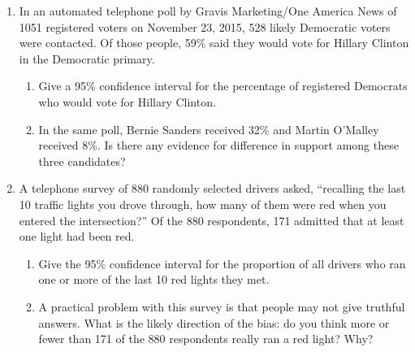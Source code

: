 \begin{enumerate}
\item In an automated telephone poll by Gravis Marketing/One America News of 1051 registered voters on November 23, 2015, 528 likely Democratic voters were contacted.  Of those people, 59\% said they would vote for Hillary Clinton in the Democratic primary.
\begin{enumerate}
	\item Give a 95\% confidence interval for the percentage of registered Democrats who would vote for Hillary Clinton. \vfill
	\item In the same poll, Bernie Sanders received 32\% and Martin O'Malley received 8\%. Is there any evidence for difference in support among these three candidates? \vfill
\end{enumerate}

\clearpage


\item A telephone survey of 880 randomly selected drivers asked, ``recalling the last 10 traffic lights you drove through, how many of them were red when you entered the intersection?'' Of the 880 respondents, 171 admitted that at least one light had been red.

\begin{enumerate}
	\item Give the 95\% confidence interval for the proportion of all drivers who ran one or more of the last 10 red lights they met. \vfill
	\item A practical problem with this survey is that people may not give truthful answers. What is the likely direction of the bias: do you think more or fewer than 171 of the 880 respondents really ran a red light? Why? \vfill
\end{enumerate}


\end{enumerate}
